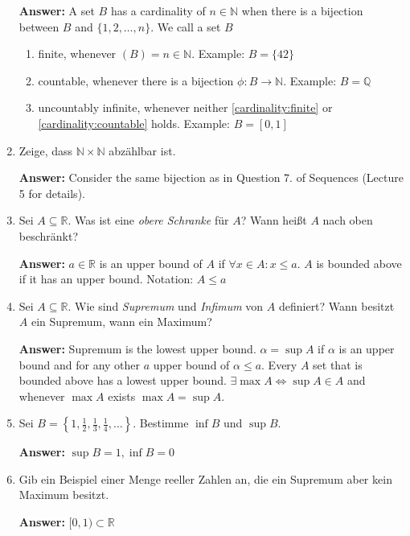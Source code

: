 \documentclass[11pt]{article}
\newcommand{\RR}[0]{\mathbb{R}}
\newcommand{\QQ}[0]{\mathbb{Q}}
\newcommand{\NN}[0]{\mathbb{N}}
\begin{document}
\begin{enumerate}
    \textbf{Answer:} A set $B$ has a cardinality of $n \in \NN$ when there is a bijection between $B$ and $\{1, 2, \dots, n\}$. We call a set $B$
    \begin{enumerate}
        \item \label{cardinality:finite} finite, whenever $\left(B\right) = n \in \NN$. Example: $B = \{42\}$
        \item \label{cardinality:countable} countable, whenever there is a bijection $\phi: B \to \NN$. Example: $B = \QQ$
        \item uncountably infinite, whenever neither \ref{cardinality:finite} or \ref{cardinality:countable} holds. Example: $B = [0, 1]$
    \end{enumerate}

    \item Zeige, dass $\NN \times \NN$ abzählbar ist.

    \textbf{Answer:} Consider the same bijection as in Question 7. of Sequences (Lecture 5 for details).

    \item Sei $A \subseteq \RR$. Was ist eine \textit{obere Schranke} für $A$? Wann heißt $A$ nach oben beschränkt?

    \textbf{Answer:} $a \in \RR$ is an upper bound of $A$ if $\forall x\in A\colon x \le a$. $A$ is bounded above if it has an upper bound. Notation: $A \le a$

    \item Sei $A \subseteq \RR$. Wie sind \textit{Supremum} und \textit{Infimum} von $A$ definiert? Wann besitzt $A$ ein Supremum, wann ein Maximum?

    \textbf{Answer:} Supremum is the lowest upper bound. $\alpha = \sup A$ if $\alpha$ is an upper bound and for any other $a$ upper bound of $\alpha \le a$. Every $A$ set that is bounded above has a lowest upper bound. $\exists \max A \Leftrightarrow \sup A \in A$ and whenever $\max A$ exists $\max A = \sup A$.

    \item Sei $B = \left\{1, \frac{1}{2}, \frac{1}{3}, \frac{1}{4}, \dots\right\}$. Bestimme $\inf B$ und $\sup B$.

    \textbf{Answer:} $\sup B = 1, \inf B = 0$

    \item Gib ein Beispiel einer Menge reeller Zahlen an, die ein Supremum aber kein Maximum besitzt.

    \textbf{Answer:} $[0, 1) \subset \RR$


\end{enumerate}
\end{document}
